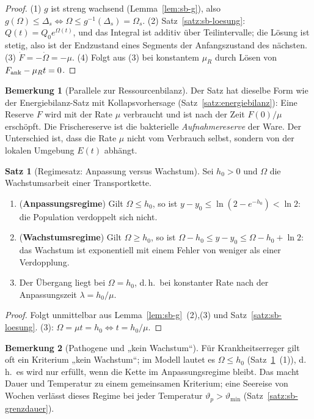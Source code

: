 \documentclass[a4paper, 12pt, twoside, openright]{report}
\theoremstyle{definition}
\theoremstyle{definition}
\newtheorem{satz}{Satz}[chapter]
\newtheorem{bemerkung}{Bemerkung}[chapter]
\begin{document}
\begin{proof}
(1) $g$ ist streng wachsend (Lemma~\ref{lem:sb-g}), also $g(\Omega)\le\Delta_s\iff\Omega\le g^{-1}(\Delta_s)=\Omega_s$.
(2) Satz~\ref{satz:sb-loesung}: $Q(t)=Q_0e^{\Omega(t)}$, und das Integral ist additiv über
Teilintervalle; die Lösung ist stetig, also ist der Endzustand eines Segments der
Anfangszustand des nächsten.
(3) $\dot F=-\dot\Omega=-\mu$. (4) Folgt aus (3) bei konstantem $\mu_R$ durch Lösen von
$F_{\rm ank}-\mu_Rt=0$.
\end{proof}

\begin{bemerkung}[Parallele zur Ressourcenbilanz]
Der Satz hat dieselbe Form wie der Energiebilanz-Satz mit Kollapsvorhersage
(Satz~\ref{satz:energiebilanz}): Eine Reserve $F$ wird mit der Rate $\mu$ verbraucht und
ist nach der Zeit $F(0)/\mu$ erschöpft. Die Frischereserve ist die bakterielle
\emph{Aufnahmereserve} der Ware. Der Unterschied ist, dass die Rate $\mu$ nicht vom
Verbrauch selbst, sondern von der lokalen Umgebung $E(t)$ abhängt.
\end{bemerkung}

\begin{satz}[Regimesatz: Anpassung versus Wachstum]\label{satz:sb-regime}
Sei $h_0>0$ und $\Omega$ die Wachstumsarbeit einer Transportkette.
\begin{enumerate}
  \item (\textbf{Anpassungsregime}) Gilt $\Omega\le h_0$, so ist $y-y_0\le\ln(2-e^{-h_0})<\ln2$:
    die Population verdoppelt sich nicht.
  \item (\textbf{Wachstumsregime}) Gilt $\Omega\ge h_0$, so ist
    $\Omega-h_0\le y-y_0\le\Omega-h_0+\ln2$: das Wachstum ist exponentiell mit einem
    Fehler von weniger als einer Verdopplung.
  \item Der Übergang liegt bei $\Omega=h_0$, d.\,h.\ bei konstanter Rate nach der
    Anpassungszeit $\lambda=h_0/\mu$.
\end{enumerate}
\end{satz}

\begin{proof}
Folgt unmittelbar aus Lemma~\ref{lem:sb-g}~(2),(3) und Satz~\ref{satz:sb-loesung}. (3):
$\Omega=\mu t=h_0\iff t=h_0/\mu$.
\end{proof}

\begin{bemerkung}[Pathogene und „kein Wachstum“]
Für Krankheitserreger gilt oft ein Kriterium „kein Wachstum“; im Modell lautet es
$\Omega\le h_0$ (Satz~\ref{satz:sb-regime}~(1)), d.\,h.\ es wird nur erfüllt, wenn die
Kette im Anpassungsregime bleibt. Das macht Dauer und Temperatur zu einem gemeinsamen
Kriterium; eine Seereise von Wochen verlässt dieses Regime bei jeder Temperatur
$\vartheta_p>\vartheta_{\min}$ (Satz~\ref{satz:sb-grenzdauer}).
\end{bemerkung}
\end{document}
